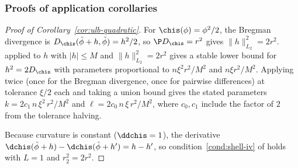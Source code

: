 \documentclass{article}
\begin{document}
\subsubsection{Proofs of application corollaries}
\label{sec:ulb-application-proofs}

\begin{proof}[Proof of Corollary~\ref{cor:ulb-quadratic}]
For $\chis(\phi) = \phi^2/2$,
the Bregman divergence is $D_{\chis}(\tilde\phi+h,\tilde\phi) = h^2/2$,
so $\P D_{\chis} = r^2$ gives $\|h\|_{L_2}^2 = 2r^2$.
 applied to $h$
with $|h| \le M$ and $\|h\|_{L_2}^2 = 2r^2$
gives a stable lower bound for $h^2 = 2D_{\chis}$
with parameters proportional to $n\xi^2 r^2/M^2$ and $n\xi r^2/M^2$.
Applying twice (once for the Bregman divergence, once for pairwise differences)
at tolerance $\xi/2$ each and taking a union bound
gives the stated parameters
$k = 2c_1\, n\, \xi^2\, r^2/M^2$
and $\ell = 2c_0\, n\, \xi\, r^2/M^2$,
where $c_0, c_1$ include the factor of $2$ from the tolerance halving.

Because curvature is constant ($\ddchis = 1$),
the derivative $\dchis(\tilde\phi + h) - \dchis(\tilde\phi + h') = h - h'$,
so condition~\ref{cond:shell-iv} of 
holds with $L = 1$ and $r_2^2 = 2r^2$.
\end{proof}
\end{document}
